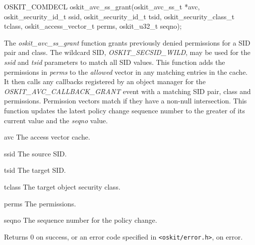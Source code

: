 \begin{apisyn}

	\funcproto OSKIT_COMDECL
	oskit_avc_ss_grant(oskit_avc_ss_t *avc, 
		         oskit_security_id_t ssid,
			 oskit_security_id_t tsid,
                         oskit_security_class_t tclass,
			 oskit_access_vector_t perms,
			 oskit_u32_t seqno);
\end{apisyn}
\begin{apidesc}

The \emph{oskit\_avc\_ss\_grant} function grants previously denied
permissions for a SID pair and class.  The wildcard SID,
\emph{OSKIT\_SECSID\_WILD}, may be used for the
\emph{ssid} and \emph{tsid} parameters to match all SID values.  This
function adds the permissions in \emph{perms} to the \emph{allowed}
vector in any matching entries in the cache.  It then calls any
callbacks registered by an object manager for the
\emph{OSKIT\_AVC\_CALLBACK\_GRANT} event with a matching SID pair,
class and permissions.  Permission vectors match if they have a
non-null intersection.  This function updates the latest policy change
sequence number to the greater of its current value and the
\emph{seqno} value.

\end{apidesc}
\begin{apiparm}
	\item[avc]
		The access vector cache.
	\item[ssid]
		The source SID.
	\item[tsid]
		The target SID.
	\item[tclass]
		The target object security class.
	\item[perms]
		The permissions.
	\item[seqno]
		The sequence number for the policy change.
\end{apiparm}
\begin{apiret}
	Returns 0 on success, or an error code specified in
	{\tt <oskit/error.h>}, on error.
\end{apiret}


